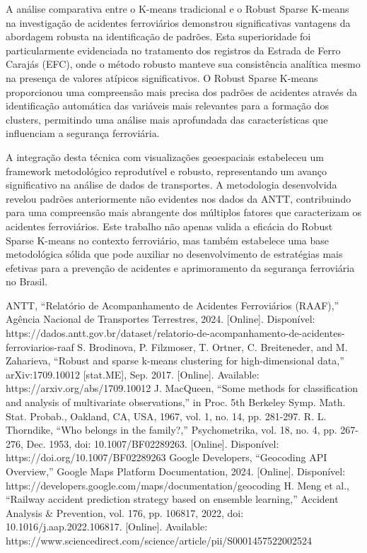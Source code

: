 \documentclass[conference]{IEEEtran}
\begin{document}
A análise comparativa entre o K-means tradicional e o Robust Sparse K-means na investigação de acidentes ferroviários demonstrou significativas vantagens da abordagem robusta na identificação de padrões. Esta superioridade foi particularmente evidenciada no tratamento dos registros da Estrada de Ferro Carajás (EFC), onde o método robusto manteve sua consistência analítica mesmo na presença de valores atípicos significativos. O Robust Sparse K-means proporcionou uma compreensão mais precisa dos padrões de acidentes através da identificação automática das variáveis mais relevantes para a formação dos clusters, permitindo uma análise mais aprofundada das características que influenciam a segurança ferroviária.

A integração desta técnica com visualizações geoespaciais estabeleceu um framework metodológico reprodutível e robusto, representando um avanço significativo na análise de dados de transportes. A metodologia desenvolvida revelou padrões anteriormente não evidentes nos dados da ANTT, contribuindo para uma compreensão mais abrangente dos múltiplos fatores que caracterizam os acidentes ferroviários. Este trabalho não apenas valida a eficácia do Robust Sparse K-means no contexto ferroviário, mas também estabelece uma base metodológica sólida que pode auxiliar no desenvolvimento de estratégias mais efetivas para a prevenção de acidentes e aprimoramento da segurança ferroviária no Brasil.

\renewcommand{\refname}{Referências}
\begin{thebibliography}{00}
 ANTT, ``Relatório de Acompanhamento de Acidentes Ferroviários (RAAF),'' Agência Nacional de Transportes Terrestres, 2024. [Online]. Disponível: https://dados.antt.gov.br/dataset/relatorio-de-acompanhamento-de-acidentes-ferroviarios-raaf
 S. Brodinova, P. Filzmoser, T. Ortner, C. Breiteneder, and M. Zaharieva, ``Robust and sparse k-means clustering for high-dimensional data,'' arXiv:1709.10012 [stat.ME], Sep. 2017. [Online]. Available: https://arxiv.org/abs/1709.10012
 J. MacQueen, ``Some methods for classification and analysis of multivariate observations,'' in Proc. 5th Berkeley Symp. Math. Stat. Probab., Oakland, CA, USA, 1967, vol. 1, no. 14, pp. 281-297.
 R. L. Thorndike, ``Who belongs in the family?,'' Psychometrika, vol. 18, no. 4, pp. 267-276, Dec. 1953, doi: 10.1007/BF02289263. [Online]. Disponível: https://doi.org/10.1007/BF02289263
 Google Developers, ``Geocoding API Overview,'' Google Maps Platform Documentation, 2024. [Online]. Disponível: https://developers.google.com/maps/documentation/geocoding
 H. Meng et al., ``Railway accident prediction strategy based on ensemble learning,'' Accident Analysis \& Prevention, vol. 176, pp. 106817, 2022, doi: 10.1016/j.aap.2022.106817. [Online]. Available: https://www.sciencedirect.com/science/article/pii/S0001457522002524
\end{thebibliography}
\end{document}
